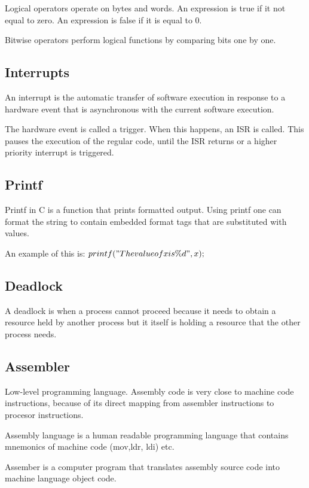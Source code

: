 Logical operators operate on bytes and words.
An expression is true if it not equal to zero. An expression is false
if it is equal to 0.

Bitwise operators perform logical functions by comparing bits one by one.



\subsection{Interrupts}
An interrupt is the automatic transfer of software execution in response to a hardware event that is asynchronous with the current software execution.

The hardware event is called a trigger. When this happens, an ISR is called.
This pauses the execution of the regular code, until the ISR returns or a
higher priority interrupt is triggered.


\subsection{Printf}

Printf in C is a function that prints formatted output.
Using printf one can format the string to contain embedded format tags
that are substituted with values.

An example of this is:
$printf("The value of x is \%d", x);$

\subsection{Deadlock}

A deadlock is when a process cannot proceed because
it needs to obtain a resource held by another process but
it itself is holding a resource that the other process needs.


\subsection{Assembler}
Low-level programming language.
Assembly code is very close to machine code instructions,
because of its direct mapping from assembler instructions
to procesor instructions.

Assembly language is a human readable programming language that
contains mnemonics of machine code (mov,ldr, ldi) etc.

Assember is a computer program that translates assembly source code
into machine language object code.

